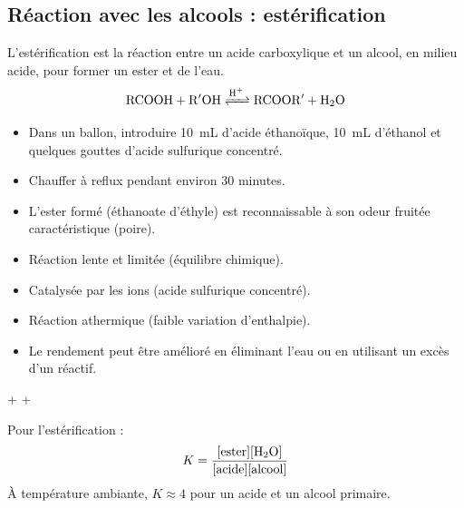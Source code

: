 \subsection{Réaction avec les alcools : estérification}

\begin{definition}[Estérification]
L'estérification est la réaction entre un acide carboxylique et un alcool, en milieu acide, pour former un ester et de l'eau.
\[
\ce{RCOOH + R$'$OH <=>[H+] RCOOR$'$ + H2O}
\]
\end{definition}

\begin{experience}
\begin{itemize}
    \item Dans un ballon, introduire \SI{10}{\mL} d'acide éthanoïque, \SI{10}{\mL} d'éthanol et quelques gouttes d'acide sulfurique concentré.
    \item Chauffer à reflux pendant environ 30 minutes.
    \item L'ester formé (éthanoate d'éthyle) est reconnaissable à son odeur fruitée caractéristique (poire).
\end{itemize}
\end{experience}

\begin{propriete}
\begin{itemize}
    \item Réaction lente et limitée (équilibre chimique).
    \item Catalysée par les ions  (acide sulfurique concentré).
    \item Réaction athermique (faible variation d'enthalpie).
    \item Le rendement peut être amélioré en éliminant l'eau ou en utilisant un excès d'un réactif.
\end{itemize}
\end{propriete}

\begin{illustration}
\begin{center}
 +  \hspace{0.5cm}  + 
\end{center}
\end{illustration}

\begin{loi}
Pour l'estérification :
\[
K = \frac{[\text{ester}][\ce{H2O}]}{[\text{acide}][\text{alcool}]}
\]
À température ambiante, $K \approx 4$ pour un acide et un alcool primaire.
\end{loi}

